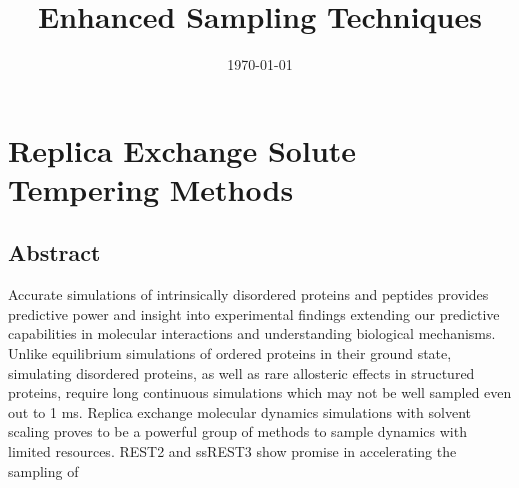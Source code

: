 \documentclass{memoir}
\title{Enhanced Sampling Techniques}
\begin{document}
\date{\today}

\maketitle

\tableofcontents

\chapter{Replica Exchange Solute Tempering Methods}
\section{Abstract}
Accurate simulations of intrinsically disordered proteins and peptides provides predictive power and insight into experimental findings extending our predictive capabilities in molecular interactions and understanding biological mechanisms. Unlike equilibrium simulations of ordered proteins in their ground state, simulating disordered proteins, as well as rare allosteric effects in structured proteins, require long continuous simulations which may not be well sampled even out to 1 ms. Replica exchange molecular dynamics simulations with solvent scaling proves to be a powerful group of methods to sample dynamics with limited resources. REST2 and ssREST3 show promise in accelerating the sampling of
\end{document}

